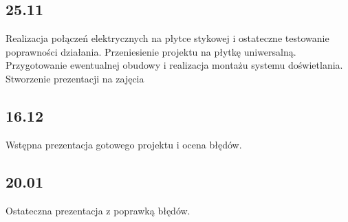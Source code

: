 \documentclass{article}
\begin{document}
\subsection{25.11}
Realizacja połączeń elektrycznych na płytce stykowej i ostateczne testowanie poprawności działania. Przeniesienie projektu na płytkę uniwersalną. Przygotowanie ewentualnej obudowy i realizacja montażu systemu doświetlania. Stworzenie prezentacji na zajęcia
\subsection{16.12}
Wstępna prezentacja gotowego projektu i ocena błędów.

\subsection{20.01}
Ostateczna prezentacja z poprawką błędów.
\end{document}
